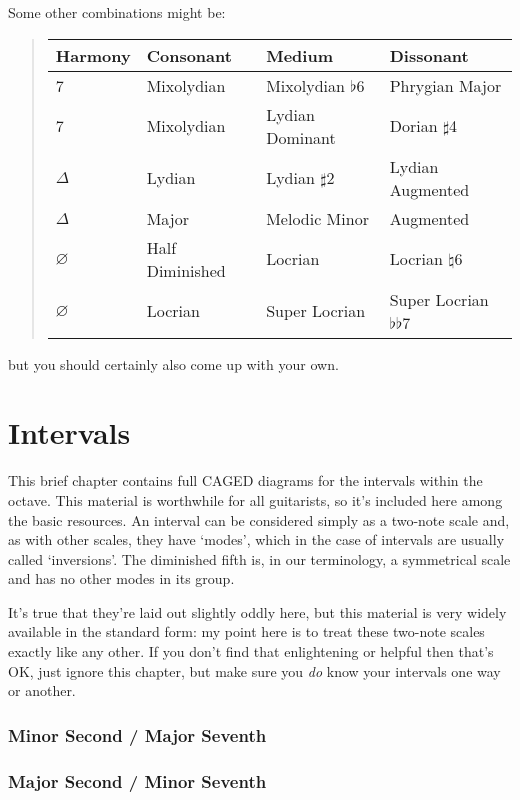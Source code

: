 \documentclass[english]{./gbook}
\begin{document}
\begin{large}
Some other combinations might be:
\begin{quote}
	\begin{tabular}{l|l|l|l}
		Harmony & Consonant & Medium & Dissonant \\
		\hline
		7 & Mixolydian & Mixolydian $\flat$6 & Phrygian Major \\
		7 & Mixolydian & Lydian Dominant & Dorian $\sharp$4 \\
		$\Delta$ & Lydian & Lydian $\sharp$2 & Lydian Augmented \\
		$\Delta$ & Major & Melodic Minor & Augmented \\
		$\varnothing$ & Half Diminished & Locrian & Locrian $\natural$6 \\
		$\varnothing$ & Locrian & Super Locrian & Super Locrian $\flat\flat$7
	\end{tabular}
\end{quote}
but you should certainly also come up with your own.





\chapter{\mbox{Intervals}}

This brief chapter contains full CAGED diagrams for the intervals within the octave. This material is worthwhile for all guitarists, so it's included here among the basic resources. An interval can be considered simply as a two-note scale and, as with other scales, they have `modes', which in the case of intervals are usually called `inversions'. The diminished fifth is, in our terminology, a symmetrical scale and has no other modes in its group.

It's true that they're laid out slightly oddly here, but this material is very widely available in the standard form: my point here is to treat these two-note scales exactly like any other. If you don't find that enlightening or helpful then that's OK, just ignore this chapter, but make sure you \emph{do} know your intervals one way or another.

\subsection*{Minor Second / Major Seventh}

\subsection*{Major Second / Minor Seventh}


\end{large}
\end{document}
